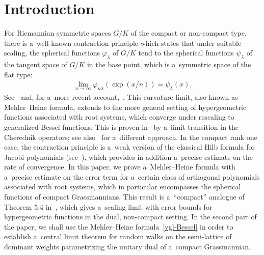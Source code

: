 \section{Introduction}

For Riemannian symmetric spaces $G/K$ of the compact or non-compact type, there is a~well-known contraction principle
which states that under suitable scaling, the spherical functions $\varphi_\lambda$ of $G/K$ tend to the spherical
functions $\psi_\lambda$ of the tangent space of $G/K$ in the base point, which is a~symmetric space of the f\/lat type:
\begin{gather*}
\lim_{n\to\infty} \varphi_{n\lambda}(\exp(x/n))=\psi_\lambda(x).
\end{gather*}
See~\cite{C} and, for a~more recent account,~\cite{BO}.
This curvature limit, also known as Mehler--Heine formula, extends to the more general setting of hypergeometric
functions associated with root systems, which converge under rescaling to generalized Bessel functions.
This is proven in~\cite{dJ} by a~limit transition in the Cherednik operators; see also~\cite{BO} for a~dif\/ferent
approach.
In the compact rank one case, the contraction principle is a~weak version of the classical Hilb formula for Jacobi
polynomials (see~\cite[Theorem 8.21.12]{Sz}), which provides in addition a~precise estimate on the rate of
convergence.
In this paper, we prove a~Mehler--Heine formula with a~precise estimate on the error term
for a~certain class of orthogonal polynomials associated with root systems, which in particular encompasses the
spherical functions of compact Grassmannians.
This result is a~``compact'' analogue of Theorem 5.4 in~\cite{RV2}, which gives a~scaling limit with error bounds for
hypergeometric functions in the dual, non-compact setting.
In the second part of the paper, we shall use the Mehler--Heine formula~\ref{vgl-Bessel} in order to establish a~central
limit theorem for random walks on the semi-lattice of dominant weights parametrizing the unitary dual of a~compact
Grassmannian.

